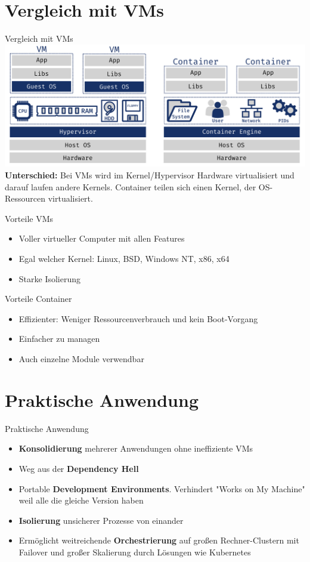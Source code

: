 \documentclass{beamer}
\begin{document}
  \section{Vergleich mit VMs}
  \begin{frame}{Vergleich mit VMs}
    \includegraphics[width=\textwidth]{comparison}
    \textbf{Unterschied:} Bei VMs wird im Kernel/Hypervisor Hardware virtualisiert und darauf laufen andere Kernels. Container teilen sich einen Kernel, der OS-Ressourcen virtualisiert. 
  \end{frame}
  \begin{frame}{Vorteile VMs}
    \begin{itemize}
      \item Voller virtueller Computer mit allen Features
      \item Egal welcher Kernel: Linux, BSD, Windows NT, x86, x64
      \item Starke Isolierung
    \end{itemize}
  \end{frame}
  \begin{frame}{Vorteile Container}
    \begin{itemize}
      \item Effizienter: Weniger Ressourcenverbrauch und kein Boot-Vorgang
      \item Einfacher zu managen
      \item Auch einzelne Module verwendbar
    \end{itemize}
  \end{frame}
  
  \section{Praktische Anwendung}
  \begin{frame}{Praktische Anwendung}
    \begin{itemize}[<+->]
      \item \textbf{Konsolidierung} mehrerer Anwendungen ohne ineffiziente VMs
      \item Weg aus der \textbf{Dependency Hell}
      \item Portable \textbf{Development Environments}. Verhindert "Works on My Machine" weil alle die gleiche Version haben
      \item \textbf{Isolierung} unsicherer Prozesse von einander
      \item Ermöglicht weitreichende \textbf{Orchestrierung} auf großen Rechner-Clustern mit Failover und großer Skalierung durch Lösungen wie Kubernetes
    \end{itemize}
  \end{frame}
   
\end{document}

